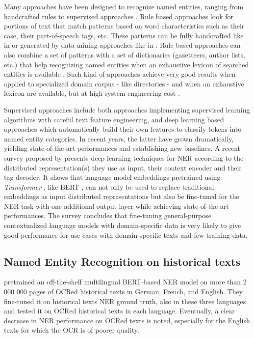 Many approaches have been designed to recognize named entities, ranging from handcrafted rules to supervised approaches \cite{nadeau2007}.
Rule based approaches look for portions of text that match patterns based on word characteristics such as their case, their part-of-speech tags, etc.
These patterns can be fully handcrafted like in \cite{bell2020automated} or generated by data mining approaches like in \cite{nouvel2011}.
Rule based approaches can also combine a set of patterns with a set of dictionaries (gazetteers, author lists, etc.) that help recognizing named entities when an exhaustive lexicon of searched entities is available \cite{mansouri2008,maurel2011}.
Such kind of approaches achieve very good results when applied to specialized domain corpus - like directories - and when an exhaustive lexicon are available, but at high system engineering cost \cite{nadeau2007}. 

Supervised approaches include both approaches implementing supervised learning algorithms with careful text feature engineering, and deep learning based approaches which automatically build their own features to classify tokens into named entity categories.
In recent years, the latter have grown dramatically, yielding state-of-the-art performances and establishing new baselines\cite{li2020}.
A recent survey proposed by \cite{li2020} presents deep learning techniques for NER according to the distributed representation(s) they use as input, their context encoder and their tag decoder.
It shows that language model embeddings pretrained using \textit{Transformer} \cite{vaswani2017attention}, like BERT \cite{devlin2018bert}, can not only be used to replace traditional embeddings as input distributed representations but also be fine-tuned for the NER task with one additional output layer while achieving state-of-the-art performances.
The survey concludes that fine-tuning general-purpose contextualized language models with domain-specific data is very likely to give good performance for use cases with domain-specific texts and few training data.

\subsection{Named Entity Recognition on historical texts}
\label{subsection:stoa-ner-on-historical-texts}
\cite{Labusch2020NamedED} pretrained an off-the-shelf multilingual BERT-based NER model on more than 2 000 000 pages of OCRed historical texts in German, French, and English. They fine-tuned it on historical texts NER ground truth, also in these three languages and tested it on OCRed historical texts in each language.
Eventually, a clear decrease in NER performance on OCRed texts is noted, especially for the English texts for which the OCR is of poorer quality. 

